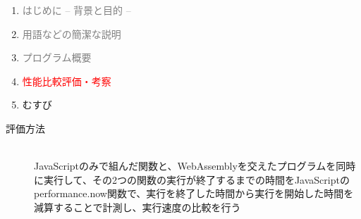 \begin{enumerate}[itemsep=0.25\zh]
	\item \textcolor{gray}{はじめに -- 背景と目的 --}
	\item \textcolor{gray}{用語などの簡潔な説明}
	\item \textcolor{gray}{プログラム概要}
	\item \textcolor{red}{性能比較評価・考察}
	\item むすび
\end{enumerate}
\newpage


\begin{description}
	
	\item[評価方法]~\\
	JavaScriptのみで組んだ関数と、WebAssemblyを交えたプログラムを同時に実行して、その2つの関数の実行が終了するまでの時間をJavaScriptのperformance.now関数で、実行を終了した時間から実行を開始した時間を減算することで計測し、実行速度の比較を行う
	\newpage
	

\end{description}
